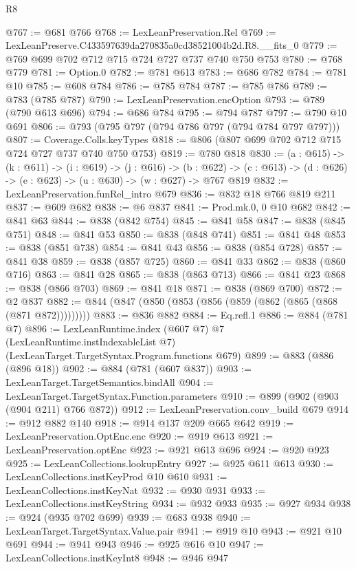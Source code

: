 \begin{lexlean}{R8}
\begin{coremodule}
@767 := @681 @766
@768 := LexLeanPreservation.Rel
@769 := LexLeanPreserve.C433597639da270835a0cd38521004b2d.R8.__fits_0
@779 := @769 @699 @702 @712 @715 @724 @727 @737 @740 @750 @753
@780 := @768 @779
@781 := Option.{0}
@782 := @781 @613
@783 := @686 @782
@784 := @781 @10
@785 := @608 @784
@786 := @785 @784
@787 := @785 @786
@789 := @783 (@785 @787)
@790 := LexLeanPreservation.encOption
@793 := @789 (@790 @613 @696)
@794 := @686 @784
@795 := @794 @787
@797 := @790 @10 @691
@806 := @793 (@795 @797 (@794 @786 @797 (@794 @784 @797 @797)))
@807 := Coverage.Colls.keyTypes
@818 := @806 (@807 @699 @702 @712 @715 @724 @727 @737 @740 @750 @753)
@819 := @780 @818
@830 := (a : @615) ->
  (k : @611) ->
  (i : @619) ->
  (j : @616) ->
  (b : @622) -> (c : @613) -> (d : @626) -> (e : @623) -> (u : @630) -> (w : @627) -> @767 @819
@832 := LexLeanPreservation.funRel_intro @679
@836 := @832 @18 @766 @819 @211
@837 := @609 @682
@838 := @6 @837
@841 := Prod.mk.{0, 0} @10 @682
@842 := @841 @63
@844 := @838 (@842 @754)
@845 := @841 @58
@847 := @838 (@845 @751)
@848 := @841 @53
@850 := @838 (@848 @741)
@851 := @841 @48
@853 := @838 (@851 @738)
@854 := @841 @43
@856 := @838 (@854 @728)
@857 := @841 @38
@859 := @838 (@857 @725)
@860 := @841 @33
@862 := @838 (@860 @716)
@863 := @841 @28
@865 := @838 (@863 @713)
@866 := @841 @23
@868 := @838 (@866 @703)
@869 := @841 @18
@871 := @838 (@869 @700)
@872 := @2 @837
@882 := @844 (@847 (@850 (@853 (@856 (@859 (@862 (@865 (@868 (@871 @872)))))))))
@883 := @836 @882
@884 := Eq.refl.{1}
@886 := @884 (@781 @7)
@896 := LexLeanRuntime.index
    (@607 @7)
    @7
    (LexLeanRuntime.instIndexableList @7)
    (LexLeanTarget.TargetSyntax.Program.functions @679)
@899 := @883 (@886 (@896 @18))
@902 := @884 (@781 (@607 @837))
@903 := LexLeanTarget.TargetSemantics.bindAll
@904 := LexLeanTarget.TargetSyntax.Function.parameters
@910 := @899 (@902 (@903 (@904 @211) @766 @872))
@912 := LexLeanPreservation.conv_build @679
@914 := @912 @882 @140
@918 := @914 @137 @209 @665 @642
@919 := LexLeanPreservation.OptEnc.enc
@920 := @919 @613
@921 := LexLeanPreservation.optEnc
@923 := @921 @613 @696
@924 := @920 @923
@925 := LexLeanCollections.lookupEntry
@927 := @925 @611 @613
@930 := LexLeanCollections.instKeyProd @10 @610
@931 := LexLeanCollections.instKeyNat
@932 := @930 @931
@933 := LexLeanCollections.instKeyString
@934 := @932 @933
@935 := @927 @934
@938 := @924 (@935 @702 @699)
@939 := @683 @938
@940 := LexLeanTarget.TargetSyntax.Value.pair
@941 := @919 @10
@943 := @921 @10 @691
@944 := @941 @943
@946 := @925 @616 @10
@947 := LexLeanCollections.instKeyInt8
@948 := @946 @947

\end{coremodule}
\end{lexlean}
